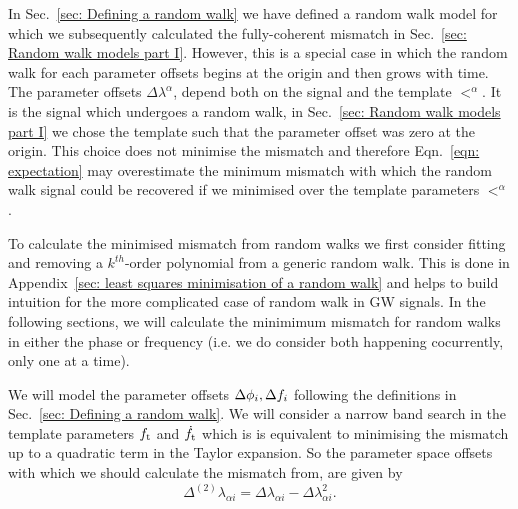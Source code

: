 
In Sec.~\ref{sec: Defining a random walk} we have defined a random walk model
for which we subsequently calculated the fully-coherent mismatch in
Sec.~\ref{sec: Random walk models part I}. However, this is a special case in
which the random walk for each parameter offsets begins at the origin and then
grows with time. The parameter offsets $\Delta\lambda^{\alpha}$, depend both on
the signal and the template $\lt^{\alpha}$. It is the signal which undergoes a random walk, in Sec.~\ref{sec:
Random walk models part I} we chose the template such that the parameter offset
was zero at the origin. This choice does not minimise the mismatch and therefore
Eqn.~\eqref{eqn: expectation} may overestimate the minimum mismatch
with which the random walk signal could be recovered if we minimised over the
template parameters $\lt^{\alpha}$.

To calculate the minimised mismatch from random walks we first consider
fitting and removing a $k^{th}$-order polynomial from a generic random walk. This
is done in Appendix~\ref{sec: least squares minimisation of a random walk} and
helps to build intuition for the more complicated case of random walk in
GW signals. In the following sections, we will calculate the minimimum
mismatch for random walks in either the phase or frequency (i.e. we do
consider both happening cocurrently, only one at a time).

We will model the parameter offsets $\Delta\phi_{i}, \Delta f_{i}$
following the definitions in Sec.~\ref{sec: Defining a random walk}.
We will consider a narrow band search in the template parameters
$f_\textrm{t}$ and $\dot{f}_\textrm{t}$ which is
is equivalent to minimising the mismatch up to a quadratic term in the Taylor
expansion. So the parameter space offsets with which we should calculate the
mismatch from, are given by
\begin{equation}
\Delta^{(2)}\lambda_{\alpha i} = \Delta\lambda_{\alpha i} - \Delta\lambda_{\alpha i}^{2}.
\end{equation}

